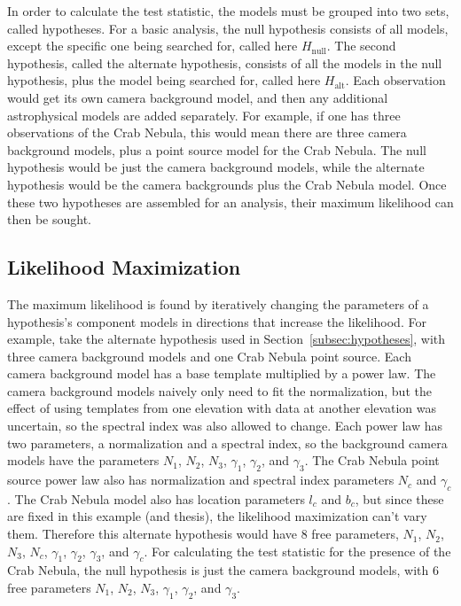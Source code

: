 In order to calculate the test statistic, the models must be grouped into two sets, called hypotheses.
For a basic analysis, the null hypothesis consists of all models, except the specific one being searched for, called here $H_{\textrm{null}}$.
The second hypothesis, called the alternate hypothesis, consists of all the models in the null hypothesis, plus the model being searched for, called here $H_{\textrm{alt}}$.
Each observation would get its own camera background model, and then any additional astrophysical models are added separately.
For example, if one has three observations of the Crab Nebula, this would mean there are three camera background models, plus a point source model for the Crab Nebula.
The null hypothesis would be just the camera background models, while the alternate hypothesis would be the camera backgrounds plus the Crab Nebula model.
Once these two hypotheses are assembled for an analysis, their maximum likelihood can then be sought.

\subsection{Likelihood Maximization}\label{subsec:likemax}
The maximum likelihood is found by iteratively changing the parameters of a hypothesis's component models in directions that increase the likelihood.
For example, take the alternate hypothesis used in Section~\ref{subsec:hypotheses}, with three camera background models and one Crab Nebula point source.
Each camera background model has a base template multiplied by a power law.
The camera background models naively only need to fit the normalization, but the effect of using templates from one elevation with data at another elevation was uncertain, so the spectral index was also allowed to change.
Each power law has two parameters, a normalization and a spectral index, so the background camera models have the parameters $N_1$, $N_2$, $N_3$, $\gamma_1$, $\gamma_2$, and $\gamma_3$.
The Crab Nebula point source power law also has normalization and spectral index parameters $N_c$ and $\gamma_c$.
The Crab Nebula model also has location parameters $l_c$ and $b_c$, but since these are fixed in this example (and thesis), the likelihood maximization can't vary them.
Therefore this alternate hypothesis would have 8 free parameters, $N_1$, $N_2$, $N_3$, $N_c$, $\gamma_1$, $\gamma_2$, $\gamma_3$, and $\gamma_c$.
For calculating the test statistic for the presence of the Crab Nebula, the null hypothesis is just the camera background models, with 6 free parameters $N_1$, $N_2$, $N_3$, $\gamma_1$, $\gamma_2$, and $\gamma_3$.

